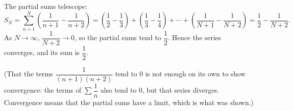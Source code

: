 The partial sums telescope:
\[
S_N=\sum_{n=1}^{N}\left(\dfrac{1}{n+1}-\dfrac{1}{n+2}\right)=\left(\dfrac{1}{2}-\dfrac{1}{3}\right)+\left(\dfrac{1}{3}-\dfrac{1}{4}\right)+\cdots+\left(\dfrac{1}{N+1}-\dfrac{1}{N+2}\right)=\dfrac{1}{2}-\dfrac{1}{N+2}.
\]
As $N\to\infty$, $\dfrac{1}{N+2}\to0$, so the partial sums tend to $\dfrac{1}{2}$. Hence the series converges, and its sum is $\boxed{\dfrac{1}{2}}$.

(That the terms $\dfrac{1}{(n+1)(n+2)}$ tend to $0$ is not enough on its own to show convergence: the terms of $\sum\dfrac{1}{n}$ also tend to $0$, but that series diverges. Convergence means that the partial sums have a limit, which is what was shown.)
